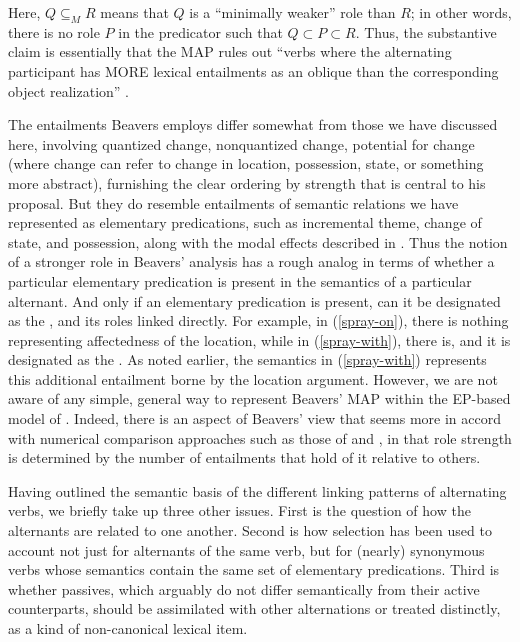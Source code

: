 \documentclass[output=paper]{langsci/langscibook}
\begin{document}
\noindent
Here, $Q\subseteq_{M}R$ means that $Q$ is a ``minimally weaker'' role than $R$; in other words, there is no role $P$ in the predicator such that $Q⊂P⊂R$.
Thus, the substantive claim is essentially that the MAP rules out ``verbs where the alternating participant has \textsc{MORE} lexical entailments as an oblique than the corresponding object realization'' \citep[849]{Beavers2010}.

The entailments Beavers employs differ somewhat from those we have discussed here, involving quantized change, nonquantized change, potential for change (where change can refer to change in location, possession, state, or something more abstract), furnishing the clear ordering by strength that is central to his proposal.
But they do resemble entailments of semantic relations we have represented as elementary predications, such as incremental theme, change of state, and possession, along with the modal effects described in \citet{KoenigandDavis2001}.
Thus the notion of a stronger role in Beavers' analysis has a rough analog in terms of whether a particular elementary predication is present in the semantics of a particular alternant.
And only if an elementary predication is present, can it be designated as the , and its roles linked directly.
For example, in (\ref{spray-on}), there is nothing representing affectedness of the location, while in (\ref{spray-with}), there is, and it is designated as the .
As noted earlier, the semantics in (\ref{spray-with}) represents this additional entailment borne by the location argument.
However, we are not aware of any simple, general way to represent Beavers' MAP within the EP-based model of \citet{KoenigandDavis2006}.
Indeed, there is an aspect of Beavers' view that seems more in accord with numerical comparison approaches such as those of \citet{Dowty1991} and \citet{AckermanandMoore2001}, in that role strength is determined by the number of entailments that hold of it relative to others.

Having outlined the semantic basis of the different linking patterns of alternating verbs, we briefly take up three other issues.
First is the question of how the alternants are related to one another.
Second is how  selection has been used to account not just for alternants of the same verb, but for (nearly) synonymous verbs whose semantics contain the same set of elementary predications.
Third is whether passives, which arguably do not differ semantically from their active counterparts, should be assimilated with other alternations or treated distinctly, as a kind of non-canonical lexical item.
\end{document}
